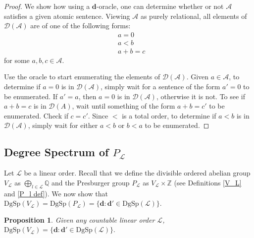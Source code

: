 \documentclass{amsart}%
\numberwithin{theorem}{section}
\newtheorem{proposition}[theorem]{Proposition}
\newcommand{\Q}{\mathbb{Q}}
\newcommand{\Z}{\mathbb{Z}}
\newcommand{\A}{\mathcal{A}}
\newcommand{\D}{\mathcal{D}}
\newcommand{\0}{\emptyset}
\newcommand{\ddd}{\boldsymbol{d}}
\newcommand{\LL}{\mathcal{L}}
\newcommand{\dgsp}{\text{DgSp}}
\begin{document}
\begin{proof}
We show how using a $\ddd$-oracle, one can determine whether or not $\A$ satisfies a given atomic sentence. Viewing $\A$ as purely relational, all elements of $\D(\A)$ are of one of the following forms:
\begin{align*}
   &a=0\\
   &a<b\\
   &a+b=c
\end{align*}
for some $a,b,c\in \A$. 



Use the oracle to start enumerating the elements of $\D(\A)$.
Given $a\in \A$, to determine if $a=0$ is in $\D(\A)$, simply wait for a sentence of the form $a'=0$ to be enumerated. If $a'=a$, then $a=0$ is in $\D(\A)$, otherwise it is not. To see if $a+b=c$ is in $\D(A)$, wait until something of the form $a+b=c'$ to be enumerated. Check if $c=c'$. Since $<$ is a total order, to determine if $a<b$ is in $\D(\A)$, simply wait for either $a<b$ or $b<a$ to be enumerated. 
\end{proof}

\subsection{Degree Spectrum of $P_\LL$} Let $\LL$ be a  linear order. Recall that we define the divisible ordered abelian group $V_\LL$ as $\bigoplus_{l\in\LL}\Q$ and the Presburger group $P_\LL$ as $V_\LL\times \Z$ (see Definitions \ref{V_L} and \ref{P_l def}). We now show that $\dgsp(V_\LL)=\dgsp(P_\LL)=\{\ddd:\ddd'\in \dgsp(\LL)\}$. 

\begin{proposition}
\label{V_L  d' in L}
Given any countable linear order $\LL$,
    $\dgsp(V_\LL)=\{\ddd:\ddd'\in \dgsp(\LL)\}. $
\end{proposition}
\end{document}
